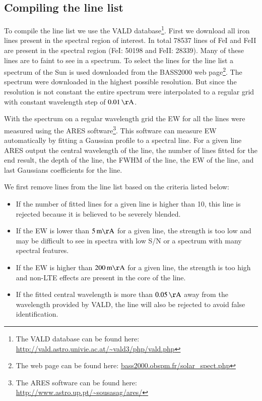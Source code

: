 \documentclass{aa}
\begin{document}
\subsection{Compiling the line list}
To compile the line list we use the VALD
database\footnote{The VALD database can be found here:
\url{http://vald.astro.univie.ac.at/~vald3/php/vald.php}}. First we
download all iron lines present in the spectral region of interest. In
total 78537 lines of FeI and FeII are present in the spectral region
(FeI: 50198 and FeII: 28339). Many of these lines are to faint to see
in a spectrum. To select the lines for the line list a spectrum of the
Sun is used downloaded from the BASS2000 web page\footnote{The web
page can be found here: \url{bass2000.obspm.fr/solar_spect.php}}. The
spectrum were downloaded in the highest possible resolution. But since
the resolution is not constant the entire spectrum were interpolated to
a regular grid with constant wavelength step of $\SI{0.01}{\AA}$.

With the spectrum on a regular wavelength grid the
EW for all the lines were measured using the ARES
software\footnote{The ARES software can be found here:
\url{http://www.astro.up.pt/~sousasag/ares/}}\citep{Sousa2007}. This
software can measure EW automatically by fitting a Gaussian profile to
a spectral line. For a given line ARES output the central wavelength of
the line, the number of lines fitted for the end result, the depth of
the line, the FWHM of the line, the EW of the line, and last Gaussians
coefficients for the line.

We first remove lines from the line list based on the criteria listed
below:
\begin{itemize}
    \item If the number of fitted lines for a given line is higher than 10,
        this line is rejected because it is believed to be severely blended.
    \item If the EW is lower than $\SI{5}{m\AA}$ for a given line, the strength
        is too low and may be difficult to see in spectra with low S/N or a
        spectrum with many spectral features.
    \item If the EW is higher than $\SI{200}{m\AA}$ for a given line, the strength
        is too high and non-LTE effects are present in the core of the line.
    \item If the fitted central wavelength is more than $\SI{0.05}{\AA}$ away
        from the wavelength provided by VALD, the line will also be rejected to
        avoid false identification.
\end{itemize}
\end{document}
